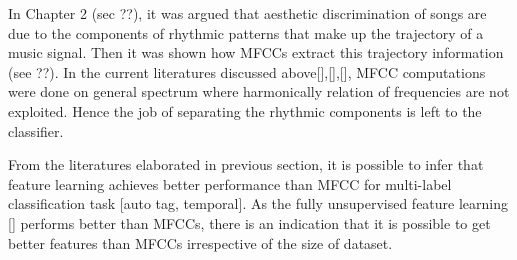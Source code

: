 In Chapter 2 (sec ??), it was argued that aesthetic discrimination of songs are due to the components of rhythmic patterns that make up the trajectory of a music signal. Then it was shown how MFCCs extract this trajectory information (see ??). In the current literatures discussed above[],[],[], MFCC computations were done on general spectrum where harmonically relation of frequencies are not exploited. Hence the job of separating the rhythmic components is left to the classifier.     

From the literatures elaborated in previous section, it is possible to infer that feature learning achieves better performance than MFCC for multi-label classification task [auto tag, temporal]. As the fully unsupervised feature learning [] performs better than MFCCs, there is an indication that it is possible to get better features than MFCCs irrespective of the size of dataset.